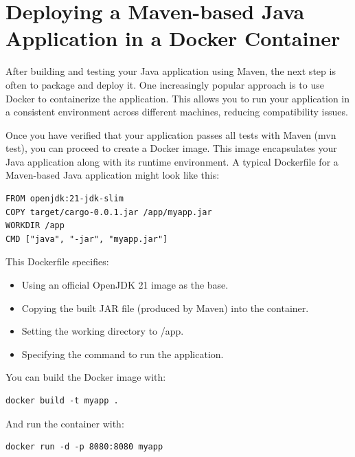 \section{Deploying a Maven-based Java Application in a Docker Container}

After building and testing your Java application using Maven, the next step is often to package and deploy it. One increasingly popular approach is to use Docker to containerize the application. This allows you to run your application in a consistent environment across different machines, reducing compatibility issues.

Once you have verified that your application passes all tests with Maven (mvn test), you can proceed to create a Docker image. This image encapsulates your Java application along with its runtime environment. A typical Dockerfile for a Maven-based Java application might look like this:

\begin{lstlisting}
FROM openjdk:21-jdk-slim
COPY target/cargo-0.0.1.jar /app/myapp.jar
WORKDIR /app
CMD ["java", "-jar", "myapp.jar"]
\end{lstlisting}

This Dockerfile specifies:
\begin{itemize}
\item Using an official OpenJDK 21 image as the base.

\item Copying the built JAR file (produced by Maven) into the container.

\item Setting the working directory to /app.

\item Specifying the command to run the application.
\end{itemize}

You can build the Docker image with:

\begin{verbatim}
docker build -t myapp .
\end{verbatim}


And run the container with:

\begin{verbatim}
docker run -d -p 8080:8080 myapp
\end{verbatim}